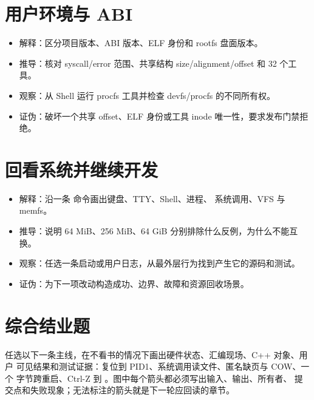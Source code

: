 \section*{用户环境与 ABI}

\begin{itemize}
  \item 解释：区分项目版本、ABI 版本、ELF 身份和 rootfs 盘面版本。
  \item 推导：核对 syscall/error 范围、共享结构 size/alignment/offset 和 32 个工具。
  \item 观察：从 Shell 运行 procfs 工具并检查 devfs/procfs 的不同所有权。
  \item 证伪：破坏一个共享 offset、ELF 身份或工具 inode 唯一性，要求发布门禁拒绝。
\end{itemize}

\section*{回看系统并继续开发}

\begin{itemize}
  \item 解释：沿一条  命令画出键盘、TTY、Shell、进程、
        系统调用、VFS 与 memfs。
  \item 推导：说明 64 MiB、256 MiB、64 GiB 分别排除什么反例，为什么不能互换。
  \item 观察：任选一条启动或用户日志，从最外层行为找到产生它的源码和测试。
  \item 证伪：为下一项改动构造成功、边界、故障和资源回收场景。
\end{itemize}

\section*{综合结业题}

任选以下一条主线，在不看书的情况下画出硬件状态、汇编现场、C++ 对象、用户
可见结果和测试证据：复位到 PID1、系统调用读文件、匿名缺页与 COW、一个
字节跨重启、Ctrl-Z 到 。图中每个箭头都必须写出输入、输出、所有者、
提交点和失败现象；无法标注的箭头就是下一轮应回读的章节。
